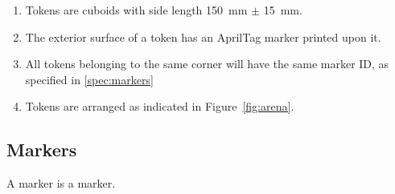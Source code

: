 \begin{enumerate}
  \item Tokens are cuboids with side length \SI{150}{mm} $\pm$ \SI{15}{mm}.
  \item The exterior surface of a token has an AprilTag marker printed upon it.
  \item All tokens belonging to the same corner will have the same marker ID, as specified in \ref{spec:markers}
  \item Tokens are arranged as indicated in Figure~\ref{fig:arena}.
\end{enumerate}

\subsection{Markers}
\label{spec:marker}

A marker is a marker.